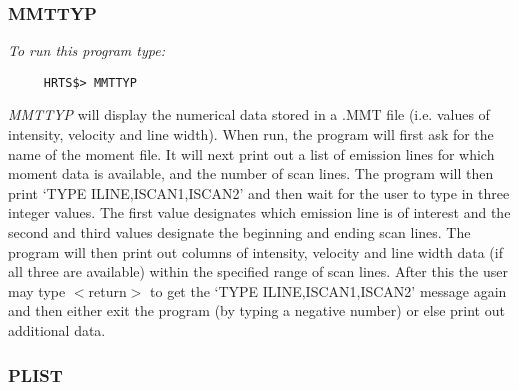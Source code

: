 \subsubsection{MMTTYP}     

{\em To run this program type:}
\begin{verbatim}
     HRTS$> MMTTYP                       
\end{verbatim}
  {\em MMTTYP} will display the numerical data stored in a .MMT file (i.e.
   values of intensity, velocity and line width).  When run, the program
   will first ask for the name of the moment file.  It will next print out
   a list of emission lines for which moment data is available, and the
   number of scan lines.  The program will then print `TYPE
   ILINE,ISCAN1,ISCAN2' and then wait for the user to type in three
   integer values.  The first value designates which emission line is of
   interest and the second and third values designate the beginning and
   ending scan lines.  The program will then print out columns of
   intensity, velocity and line width data (if all three are available)
   within the specified range of scan lines.  After this the user may type
   $<$return$>$ to get the `TYPE ILINE,ISCAN1,ISCAN2' message again and then
   either exit the program (by typing a negative number) or else print out
   additional data.

\subsubsection{PLIST}           

